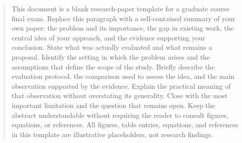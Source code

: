 \begin{abstract}
This document is a blank research-paper template for a graduate course
final exam. Replace this paragraph with a self-contained summary of your
own paper: the problem and its importance, the gap in existing work, the
central idea of your approach, and the evidence supporting your conclusion.
State what was actually evaluated and what remains a proposal.
Identify the setting in which the problem arises and the assumptions that
define the scope of the study. Briefly describe the evaluation protocol,
the comparison used to assess the idea, and the main observation supported
by the evidence. Explain the practical meaning of that observation without
overstating its generality. Close with the most important limitation and
the question that remains open. Keep the abstract understandable without
requiring the reader to consult figures, equations, or references.
All figures, table entries, equations, and references in this template
are illustrative placeholders, not research findings.
\end{abstract}
